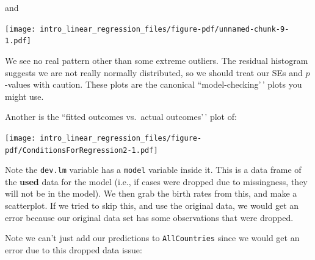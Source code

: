 \documentclass[
  letterpaper,
  DIV=11,
  numbers=noendperiod]{scrreprt}
\newenvironment{Shaded}{}{}
\newcommand{\AttributeTok}[1]{\textcolor[rgb]{0.49,0.56,0.16}{#1}}
\newcommand{\DecValTok}[1]{\textcolor[rgb]{0.25,0.63,0.44}{#1}}
\newcommand{\FunctionTok}[1]{\textcolor[rgb]{0.02,0.16,0.49}{#1}}
\newcommand{\NormalTok}[1]{#1}
\newcommand{\OtherTok}[1]{\textcolor[rgb]{0.00,0.44,0.13}{#1}}
\newcommand{\SpecialCharTok}[1]{\textcolor[rgb]{0.25,0.44,0.63}{#1}}
\newcommand{\StringTok}[1]{\textcolor[rgb]{0.25,0.44,0.63}{#1}}
\begin{document}
and

\begin{Shaded}
\end{Shaded}

\begin{center}
\texttt{[image: intro\_linear\_regression\_files/figure-pdf/unnamed-chunk-9-1.pdf]}
\end{center}

We see no real pattern other than some extreme outliers. The residual
histogram suggests we are not really normally distributed, so we should
treat our SEs and \(p\)-values with caution. These plots are the
canonical ``model-checking'\,' plots you might use.

Another is the ``fitted outcomes vs.~actual outcomes'\,' plot of:

\begin{Shaded}
\end{Shaded}

\begin{center}
\texttt{[image: intro\_linear\_regression\_files/figure-pdf/ConditionsForRegression2-1.pdf]}
\end{center}

Note the \texttt{dev.lm} variable has a \texttt{model} variable inside
it. This is a data frame of the \textbf{used} data for the model (i.e.,
if cases were dropped due to missingness, they will not be in the
model). We then grab the birth rates from this, and make a scatterplot.
If we tried to skip this, and use the original data, we would get an
error because our original data set has some observations that were
dropped.

Note we can't just add our predictions to \texttt{AllCountries} since we
would get an error due to this dropped data issue:

\begin{Shaded}
\end{Shaded}
\end{document}
